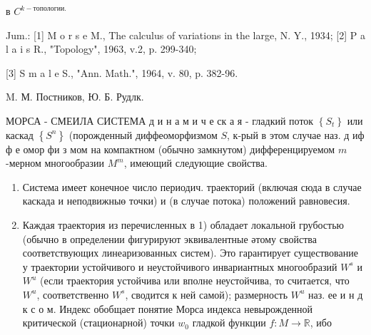 \documentclass[10pt]{article}
\begin{document}
в $C^{k-т о п о л о г и и . ~}$



Jum.: [1] M o r s e M., The calculus of variations in the large, N. Y., 1934; [2] P a l a i s R., "Topology", 1963, v.2, p. 299-340;

[3] S m a l e S., "Ann. Math.", 1964, v. 80, p. 382-96.



M. М. Постников, Ю. Б. Рудлк.



МОРСА - СМЕИЛА СИСТЕМА д и н а м и ч е ск а я - гладкий поток $\left\{S_{t}\right\}$ или каскад $\left\{S^{n}\right\}$ (порожденный диффеоморфизмом $S$, к-рый в этом случае наз. д иф ф е омор фи з мом на компактном (обычно замкнутом) дифференцируемом $m$-мерном многообразии $M^{m}$, имеющий следующие свойства.



\begin{enumerate}

  \item Система имеет конечное число периодич. траекторий (включая сюда в случае каскада и неподвижныө точки) и (в случае потока) положений равновесия.



  \item Каждая траектория из перечисленных в 1) обладает локальной грубостью (обычно в определении фигурируют эквивалентные әтому свойства соответствующих линеаризованных систем). Это гарантирует существование у траектории устойчивого и неустойчивого инвариантных многообразий $W^{s}$ и $W^{u}$ (если траектория устойчива или вполне неустойчива, то считается, что $W^{u}$, соответственно $W^{s}$, сводится к ней самой); размерность $W^{u}$ наз. ее и н д к с о м. Индекс обобщает понятие $М о р с а$ индекса невырожденной критической (стационарной) точки $w_{0}$ гладкой функции $f: M \rightarrow \mathbb{R}$, ибо



\end{enumerate}
\end{document}
